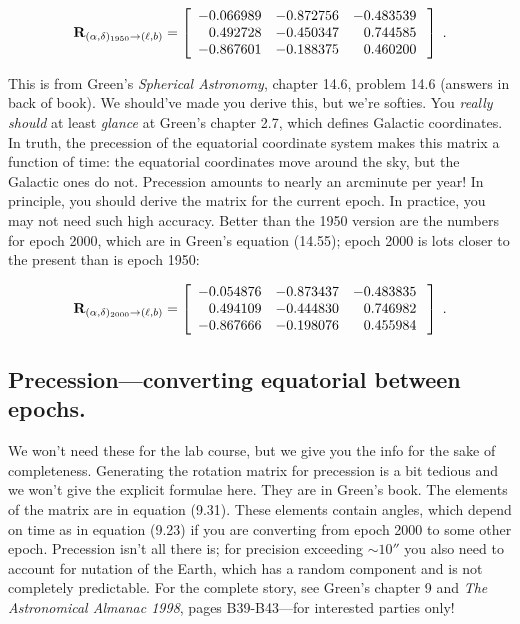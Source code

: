 \begin{mathletters} 
\begin{eqnarray} 
{\bf R}_{(\alpha, \delta)_{1950} \rightarrow (\ell, b)} = \left[ 
\begin{array}{rrr}
   -0.066989 &  -0.872756 &  -0.483539 \\
    0.492728 &  -0.450347 &   0.744585 \\
   -0.867601 &  -0.188375 &   0.460200 \\
 \end{array} 
\; \right] \; .
\end{eqnarray} 

\noindent This is from Green's {\it Spherical Astronomy}, chapter 14.6,
problem 14.6 (answers in back of book).  We should've made you derive
this, but we're softies.  You {\it really should} at least {\it glance}
at Green's chapter 2.7, which defines Galactic coordinates.  In truth,
the precession of the equatorial coordinate system makes this matrix a
function of time: the equatorial coordinates move around the sky, but
the Galactic ones do not.  Precession amounts to nearly an arcminute per
year! In principle, you should derive the matrix for the current epoch. 
In practice, you may not need such high accuracy.  Better than the 1950
version are the numbers for epoch 2000, which are in Green's equation
(14.55); epoch 2000 is lots closer to the present than is epoch 1950:

\begin{eqnarray} 
{\bf R}_{(\alpha, \delta)_{2000} \rightarrow (\ell, b)} = \left[ 
\begin{array}{rrr}
   -0.054876 &  -0.873437 &  -0.483835 \\
    0.494109 &  -0.444830 &   0.746982 \\
   -0.867666 &  -0.198076 &   0.455984 \\
\end{array} 
\; \right] \; .
\end{eqnarray} 
\end{mathletters} 

\subsection {Precession---converting equatorial between epochs.}

	We won't need these for the lab course, but we give you the info
for the sake of completeness.  Generating the rotation matrix for
precession is a bit tedious and we won't give the explicit formulae
here.  They are in Green's book.  The elements of the matrix are in
equation (9.31).  These elements contain angles, which depend on time as
in equation (9.23) if you are converting from epoch 2000 to some other
epoch.  Precession isn't all there is; for precision exceeding $\sim
10''$ you also need to account for nutation of the Earth, which has a
random component and is not completely predictable.  For the complete
story, see Green's chapter 9 and {\it The Astronomical Almanac 1998}, 
pages B39-B43---for interested parties only!

